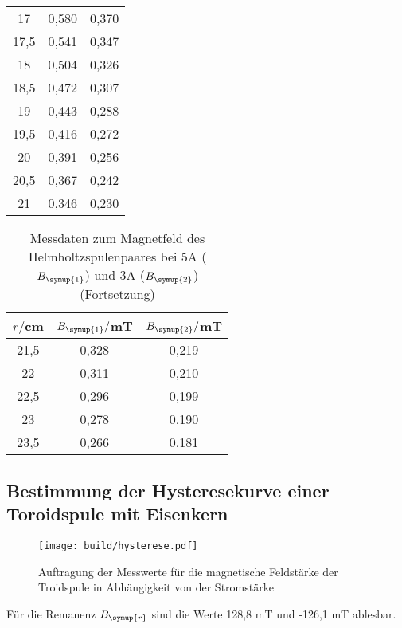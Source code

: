 \begin{table}
\begin{tabular}{c c c}
    17	  &  0,580 & 0,370\\
    17,5	&  0,541 & 0,347\\
    18	  &  0,504 & 0,326\\
    18,5	&  0,472 & 0,307\\
    19	  &  0,443 & 0,288\\
    19,5	&  0,416 & 0,272\\
    20	  &  0,391 & 0,256\\
    20,5	&  0,367 & 0,242\\
    21	  &  0,346 & 0,230\\
    \bottomrule
  \end{tabular}
\end{table}

\begin{table}
  \centering
  \caption{Messdaten zum Magnetfeld des Helmholtzspulenpaares bei 5A ($B_{\symup{1}}$)
  und 3A ($B_{\symup{2}}$)(Fortsetzung)}
  \label{tab:helmholtz}
  \begin{tabular}{c c c}
    \toprule
    $r/$cm & $B_{\symup{1}}/$mT & $B_{\symup{2}}/$mT\\
    \midrule
    21,5	&  0,328 & 0,219\\
    22	  &  0,311 & 0,210\\
    22,5	&  0,296 & 0,199\\
    23	  &  0,278 & 0,190\\
    23,5	&  0,266 & 0,181\\
    \bottomrule
  \end{tabular}
\end{table}



\subsection{Bestimmung der Hysteresekurve einer Toroidspule mit Eisenkern}



\begin{figure}
  \centering
  \texttt{[image: build/hysterese.pdf]}
  \caption{Auftragung der Messwerte für die magnetische Feldstärke der Troidspule
  in Abhängigkeit von der Stromstärke}
  \label{fig:hysterese}
\end{figure}

Für die Remanenz $B_{\symup{r}}$ sind die Werte 128,8 mT und -126,1 mT ablesbar.
